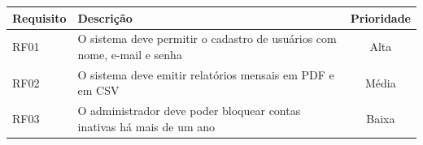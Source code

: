 \begin{quadro}[h]
\begin{ilustracao}{\caption{Requisitos do sistema}\label{qua:cmp-float}}{\elaboracaopropria
  }
\begin{tabularx}{\linewidth}{|l|X|c|}
\hline
\textbf{Requisito} & \textbf{Descrição} & \textbf{Prioridade} \\
\hline
RF01 & O sistema deve permitir o cadastro de usuários com nome, e-mail e senha & Alta \\
\hline
RF02 & O sistema deve emitir relatórios mensais em PDF e em CSV & Média \\
\hline
RF03 & O administrador deve poder bloquear contas inativas há mais de um ano & Baixa \\
\hline
\end{tabularx}
\end{ilustracao}
\end{quadro}
